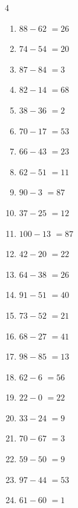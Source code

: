 \begin{multicols}{4}
\begin{enumerate}
  \item $88-62$
        $=26$

  \item $74-54$
        $=20$

  \item $87-84$
        $=3$

  \item $82-14$
        $=68$

  \item $38-36$
        $=2$

  \item $70-17$
        $=53$

  \item $66-43$
        $=23$

  \item $62-51$
        $=11$

  \item $90-3$
        $=87$

  \item $37-25$
        $=12$

  \item $100-13$
        $=87$

  \item $42-20$
        $=22$

  \item $64-38$
        $=26$

  \item $91-51$
        $=40$

  \item $73-52$
        $=21$

  \item $68-27$
        $=41$

  \item $98-85$
        $=13$

  \item $62-6$
        $=56$

  \item $22-0$
        $=22$

  \item $33-24$
        $=9$

  \item $70-67$
        $=3$

  \item $59-50$
        $=9$

  \item $97-44$
        $=53$

  \item $61-60$
        $=1$


\end{enumerate}
\end{multicols}

